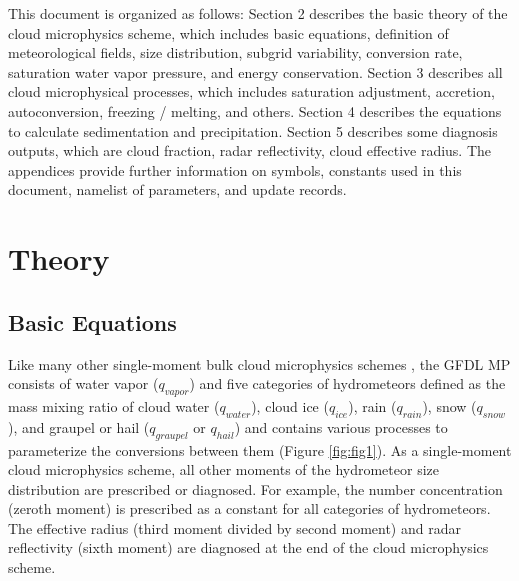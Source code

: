 \documentclass[letterpaper,titlepage,10pt]{article}
\numberwithin{equation}{section}
\begin{document}
This document is organized as follows: Section 2 describes the basic theory of the cloud microphysics scheme, which includes basic equations, definition of meteorological fields, size distribution, subgrid variability, conversion rate, saturation water vapor pressure, and energy conservation. Section 3 describes all cloud microphysical processes, which includes saturation adjustment, accretion, autoconversion, freezing / melting, and others. Section 4 describes the equations to calculate sedimentation and precipitation. Section 5 describes some diagnosis outputs, which are cloud fraction, radar reflectivity, cloud effective radius. The appendices provide further information on symbols, constants used in this document, namelist of parameters, and update records.


\newpage
\section{Theory}
\label{sec:the}


\subsection{Basic Equations}

Like many other single-moment bulk cloud microphysics schemes \citep{rutledge1983them, rutledge1984them, cotton1986nume, dudhia1989nume, tao1993godd, walko1995newr, thompson2004expl, hong2006thew, nogherotto2016nume}, the GFDL MP consists of water vapor ($q_{vapor}$) and five categories of hydrometeors defined as the mass mixing ratio of cloud water ($q_{water}$), cloud ice ($q_{ice}$), rain ($q_{rain}$), snow ($q_{snow}$), and graupel or hail ($q_{graupel}$ or $q_{hail}$) and contains various processes to parameterize the conversions between them (Figure \ref{fig:fig1}). As a single-moment cloud microphysics scheme, all other moments of the hydrometeor size distribution are prescribed or diagnosed. For example, the number concentration (zeroth moment) is prescribed as a constant for all categories of hydrometeors. The effective radius (third moment divided by second moment) and radar reflectivity (sixth moment) are diagnosed at the end of the cloud microphysics scheme.
\end{document}

